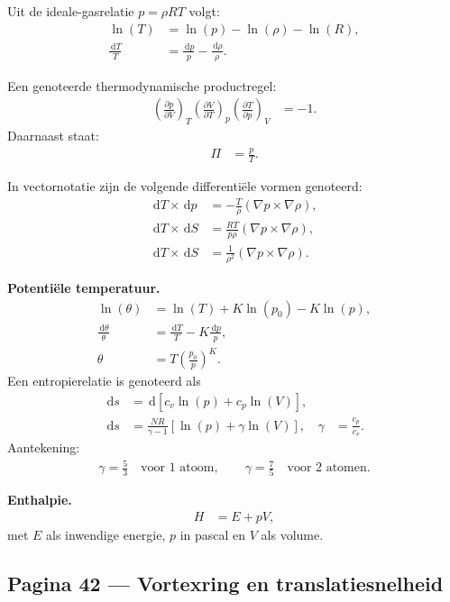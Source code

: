 \documentclass[11pt]{article}
\newcommand{\dd}{\,\mathrm{d}}
\newcommand{\pd}[2]{\frac{\partial #1}{\partial #2}}
\begin{document}
Uit de ideale-gasrelatie $p=\rho R T$ volgt:
\begin{align*}
\ln(T)&=\ln(p)-\ln(\rho)-\ln(R),\\
\frac{\dd T}{T}&=\frac{\dd p}{p}-\frac{\dd \rho}{\rho}.
\end{align*}

Een genoteerde thermodynamische productregel:
\begin{align*}
\left(\pd{p}{V}\right)_{T}
\left(\pd{V}{T}\right)_{p}
\left(\pd{T}{p}\right)_{V}
&=-1.
\end{align*}
Daarnaast staat:
\begin{align*}
\Pi &= \frac{p}{T}.
\end{align*}

In vectornotatie zijn de volgende differentiële vormen genoteerd:
\begin{align*}
\dd T \times \dd p
  &= -\frac{T}{\rho}\left(\nabla p\times \nabla \rho\right),\\
\dd T \times \dd S
  &= \frac{RT}{p\rho}\left(\nabla p\times \nabla \rho\right),\\
\dd T \times \dd S
  &= \frac{1}{\rho^2}\left(\nabla p\times \nabla \rho\right).
\end{align*}

\textbf{Potentiële temperatuur.}
\begin{align*}
\ln(\theta)
  &=\ln(T)+K\ln(p_0)-K\ln(p),\\
\frac{\dd \theta}{\theta}
  &=\frac{\dd T}{T}-K\frac{\dd p}{p},\\
\theta
  &=T\left(\frac{p_0}{p}\right)^K.
\end{align*}
Een entropierelatie is genoteerd als
\begin{align*}
\dd s
  &= \dd\left[c_v\ln(p)+c_p\ln(V)\right],\\
\dd s
  &= \frac{NR}{\gamma-1}\left[\ln(p)+\gamma\ln(V)\right],
&
\gamma&=\frac{c_p}{c_v}.
\end{align*}
Aantekening:
\begin{align*}
\gamma=\frac{5}{3}\quad\text{voor 1 atoom},
\qquad
\gamma=\frac{7}{5}\quad\text{voor 2 atomen}.
\end{align*}

\textbf{Enthalpie.}
\begin{align*}
H &= E+pV,
\end{align*}
met $E$ als inwendige energie, $p$ in pascal en $V$ als volume.

\subsection*{Pagina 42 --- Vortexring en translatiesnelheid}
\end{document}
